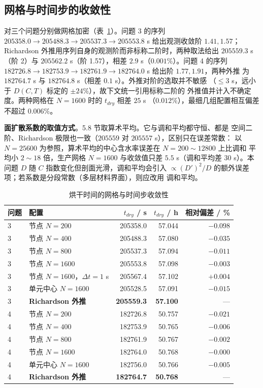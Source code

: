 \subsection{网格与时间步的收敛性}

对三个问题分别做网格加密（表~\ref{tab:conv}）。问题 3 的序列
$205358.0\to205488.3\to205537.3\to205553.8$ s 给出观测收敛阶 $1.41,1.57$；
Richardson 外推用序列自身的观测阶而非标称二阶时，两种取法给出 $205559.3$ s
（阶 2）与 $205562.2$ s（阶 1.57），相差 $2.9$ s（$0.001\%$）。问题 4 的序列
$182726.8\to182753.9\to182761.9\to182764.0$ s 给出阶 $1.77,1.91$，两种外推
为 $182764.7$ s 与 $182764.8$ s（相差 $0.1$ s）。外推对阶的选取并不敏感
（$\le3$ s，远小于 $D(C,T)$ 标定的 $\pm24\%$），故下文统一引用标称二阶的
外推值并计入不确定度。两种网格在 $N=1600$ 时的 $t_{dry}$ 相差 $25$ s
（$0.012\%$），最细几组配置相互偏差不超过 $0.006\%$。

\textbf{面扩散系数的取值方式}。5.8 节取算术平均。它与调和平均都守恒、都是
空间二阶、Richardson 极限也一致（$205559$ 对 $205557$ s），区别只在误差常数：
以 $N=25600$ 为参照，算术平均的中心含水率误差在 $N=200\sim12800$ 上比调和
平均小 $2\sim18$ 倍，生产网格 $N=1600$ 与收敛值只差 $5.5$ s（调和平均差
$30$ s）。本问题 $D$ 随 $C$ 指数变化但剖面光滑，调和平均会引入
$\propto(D')^2/D$ 的额外误差项；若系数是分段常数（多层材料界面），则应改用
调和平均。

\begin{table}[htbp]
\centering
\caption{烘干时间的网格与时间步收敛性}
\label{tab:conv}
\footnotesize
\begin{tabular}{llrrr}
\toprule[1.5pt]
问题 & 配置 & $t_{dry}$ / s & $t_{dry}$ / h & 相对偏差 / \% \\
\midrule[1pt]
3 & 节点 $N=200$        & 205358.0 & 57.044 & $-0.098$ \\
3 & 节点 $N=400$        & 205488.3 & 57.080 & $-0.035$ \\
3 & 节点 $N=800$        & 205537.3 & 57.094 & $-0.011$ \\
3 & 节点 $N=1600$       & 205553.8 & 57.098 & $-0.003$ \\
3 & 节点 $N=1600$，$\Delta t=1$ s & 205567.4 & 57.102 & $+0.004$ \\
3 & 单元中心 $N=1600$   & 205528.5 & 57.091 & $-0.015$ \\
3 & \textbf{Richardson 外推} & \textbf{205559.3} & \textbf{57.100} & --- \\
\midrule[1pt]
4 & 节点 $N=200$        & 182726.8 & 50.757 & $-0.021$ \\
4 & 节点 $N=400$        & 182753.9 & 50.765 & $-0.006$ \\
4 & 节点 $N=800$        & 182761.9 & 50.767 & $-0.002$ \\
4 & 节点 $N=1600$       & 182764.0 & 50.768 & $-0.000$ \\
4 & 单元中心 $N=1600$   & 182756.0 & 50.766 & $-0.005$ \\
4 & \textbf{Richardson 外推} & \textbf{182764.7} & \textbf{50.768} & --- \\
\bottomrule[1.5pt]
\end{tabular}
\end{table}

